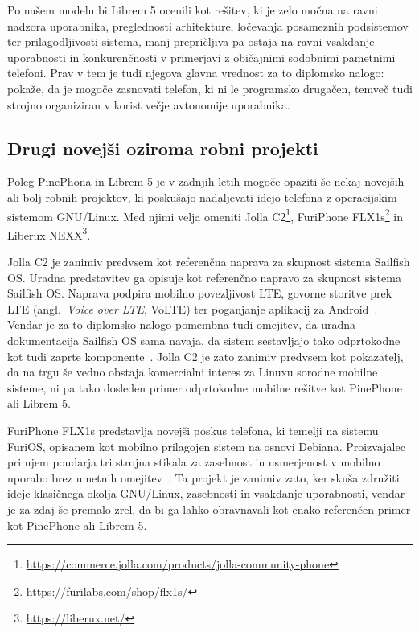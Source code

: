 \documentclass[a4paper,12pt,openright]{book}
\begin{document}
Po našem modelu bi Librem 5 ocenili kot rešitev, ki je zelo močna na ravni nadzora uporabnika, preglednosti arhitekture, ločevanja posameznih podsistemov ter prilagodljivosti sistema, manj prepričljiva pa ostaja na ravni vsakdanje uporabnosti in konkurenčnosti v primerjavi z običajnimi sodobnimi pametnimi telefoni.
Prav v tem je tudi njegova glavna vrednost za to diplomsko nalogo: pokaže, da je mogoče zasnovati telefon, ki ni le programsko drugačen, temveč tudi strojno organiziran v korist večje avtonomije uporabnika.

\subsection{Drugi novejši oziroma robni projekti}

Poleg PinePhona in Librem 5 je v zadnjih letih mogoče opaziti še nekaj novejših ali bolj robnih projektov, ki poskušajo nadaljevati idejo telefona z operacijskim sistemom GNU/Linux.
Med njimi velja omeniti Jolla C2\footnote{\url{https://commerce.jolla.com/products/jolla-community-phone}}, FuriPhone FLX1s\footnote{\url{https://furilabs.com/shop/flx1s/}} in Liberux NEXX\footnote{\url{https://liberux.net/}}.

Jolla C2 je zanimiv predvsem kot referenčna naprava za skupnost sistema Sailfish OS.
Uradna predstavitev ga opisuje kot referenčno napravo za skupnost sistema Sailfish OS.
Naprava podpira mobilno povezljivost LTE, govorne storitve prek LTE (angl.~\textit{Voice over LTE}, VoLTE) ter poganjanje aplikacij za Android~\cite{jolla_c2,jolla_c2_android_apps}.
Vendar je za to diplomsko nalogo pomembna tudi omejitev, da uradna dokumentacija Sailfish OS sama navaja, da sistem sestavljajo tako odprtokodne kot tudi zaprte komponente~\cite{sailfish_open_source}.
Jolla C2 je zato zanimiv predvsem kot pokazatelj, da na trgu še vedno obstaja komercialni interes za Linuxu sorodne mobilne sisteme, ni pa tako dosleden primer odprtokodne mobilne rešitve kot PinePhone ali Librem 5.

FuriPhone FLX1s predstavlja novejši poskus telefona, ki temelji na sistemu FuriOS, opisanem kot mobilno prilagojen sistem na osnovi Debiana.
Proizvajalec pri njem poudarja tri strojna stikala za zasebnost in usmerjenost v mobilno uporabo brez umetnih omejitev~\cite{furiphone_flx1s,furiphone_flx1s_switches}.
Ta projekt je zanimiv zato, ker skuša združiti ideje klasičnega okolja GNU/Linux, zasebnosti in vsakdanje uporabnosti, vendar je za zdaj še premalo zrel, da bi ga lahko obravnavali kot enako referenčen primer kot PinePhone ali Librem 5.
\end{document}
